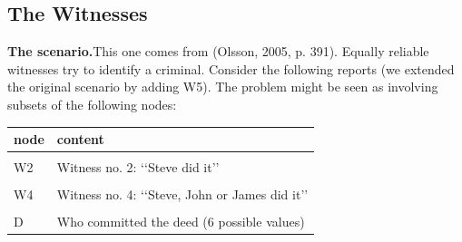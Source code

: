 \documentclass[10pt,]{scrartcl}
\newcommand{\s}[1]{\mbox{\textsf{#1}}}
\begin{document}





\subsection{The Witnesses}

\textbf{The scenario.}This one comes from (Olsson, 2005, p. 391). Equally reliable witnesses try to identify a criminal. Consider the
following reports (we extended the original scenario by adding \s{W5}). The problem might be seen as involving subsets of the following nodes:

\begin{table}[H]
\centering
\begin{tabular}{ll}
\toprule
node & content\\
\midrule
\cellcolor{gray!6}{W1} & \cellcolor{gray!6}{Witness no. 1: ‘‘Steve did it’’}\\
W2 & Witness no. 2: ‘‘Steve did it’’\\
\cellcolor{gray!6}{W3} & \cellcolor{gray!6}{Witness no. 3: ‘‘Steve, Martin or David did it’’}\\
W4 & Witness no. 4: ‘‘Steve, John or James did it’’\\
\cellcolor{gray!6}{W5} & \cellcolor{gray!6}{Wittness no. 5: ‘‘Steve, John or Peter did it’’}\\
D & Who committed the deed (6  possible values)\\
\bottomrule
\end{tabular}
\end{table}
\end{document}
